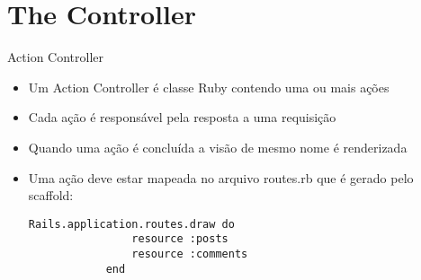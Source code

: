 \section{The Controller}
\begin{frame}[t, fragile]{Action Controller}
	\begin{itemize}
		\item Um \alert{Action Controller} é classe Ruby contendo uma ou mais ações
		\item Cada \alert{ação} é responsável pela resposta a uma requisição
		\item Quando uma ação é concluída a \alert{visão} de mesmo nome é \alert{renderizada}
		\item Uma ação deve estar \alert{mapeada} no arquivo \alert{routes.rb} que é gerado 
			pelo scaffold:
		\begin{lstlisting}[style=RubyInputStyle]
			Rails.application.routes.draw do 
				resource :posts
				resource :comments
			end 
		\end{lstlisting}			
	\end{itemize}	
\end{frame}